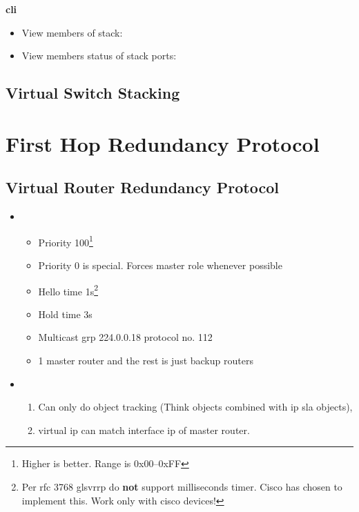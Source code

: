 \textbf{\gls{cli}}

\begin{itemize}
    \item View members of stack: 
    \item View members status of stack ports: 
\end{itemize}

\subsection[VSS]{Virtual Switch Stacking}


\newpage

\section[FHRP]{First Hop Redundancy Protocol}


\newpage

\subsection[VRRP]{Virtual Router Redundancy Protocol}

\begin{itemize}
    \item {}
    \begin{itemize}
        \item Priority 100\footnote{Higher is better. Range is 0x00--0xFF}
        \item Priority 0 is special. Forces master role whenever possible
        \item Hello time 1s\footnote{Per \gls{rfc} 3768 gls{vrrp} do \textbf{not} support milliseconds timer. Cisco has chosen to implement this. Work only with cisco devices!}
        \item Hold time 3s
        \item Multicast grp 224.0.0.18 protocol no. 112
        \item 1 master router and the rest is just backup routers
    \end{itemize}
    \item {}
    \begin{enumerate}
        \item Can only do object tracking {\footnotesize (Think objects combined with ip sla objects),}
        \item virtual ip can match interface ip of master router.
    \end{enumerate}
\end{itemize}

